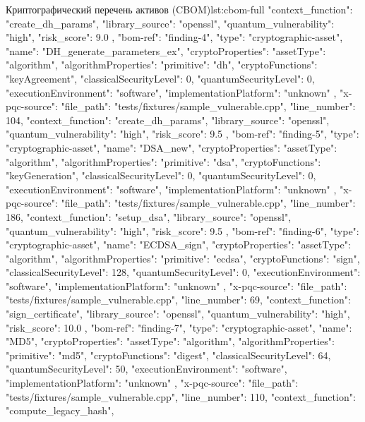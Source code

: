 \documentclass{itmo-vkr}
\begin{document}
\begin{itmolisting}[JSON]{Криптографический перечень активов (CBOM)}{lst:cbom-full}
{{{				"context_function": "create_dh_params",
				"library_source": "openssl",
				"quantum_vulnerability": "high",
				"risk_score": 9.0
			}
		},
		{
			"bom-ref": "finding-4",
			"type": "cryptographic-asset",
			"name": "DH_generate_parameters_ex",
			"cryptoProperties": {
				"assetType": "algorithm",
				"algorithmProperties": {
					"primitive": "dh",
					"cryptoFunctions": "keyAgreement",
					"classicalSecurityLevel": 0,
					"quantumSecurityLevel": 0,
					"executionEnvironment": "software",
					"implementationPlatform": "unknown"
				}
			},
			"x-pqc-source": {
				"file_path": "tests/fixtures/sample_vulnerable.cpp",
				"line_number": 104,
				"context_function": "create_dh_params",
				"library_source": "openssl",
				"quantum_vulnerability": "high",
				"risk_score": 9.5
			}
		},
		{
			"bom-ref": "finding-5",
			"type": "cryptographic-asset",
			"name": "DSA_new",
			"cryptoProperties": {
				"assetType": "algorithm",
				"algorithmProperties": {
					"primitive": "dsa",
					"cryptoFunctions": "keyGeneration",
					"classicalSecurityLevel": 0,
					"quantumSecurityLevel": 0,
					"executionEnvironment": "software",
					"implementationPlatform": "unknown"
				}
			},
			"x-pqc-source": {
				"file_path": "tests/fixtures/sample_vulnerable.cpp",
				"line_number": 186,
				"context_function": "setup_dsa",
				"library_source": "openssl",
				"quantum_vulnerability": "high",
				"risk_score": 9.5
			}
		},
		{
			"bom-ref": "finding-6",
			"type": "cryptographic-asset",
			"name": "ECDSA_sign",
			"cryptoProperties": {
				"assetType": "algorithm",
				"algorithmProperties": {
					"primitive": "ecdsa",
					"cryptoFunctions": "sign",
					"classicalSecurityLevel": 128,
					"quantumSecurityLevel": 0,
					"executionEnvironment": "software",
					"implementationPlatform": "unknown"
				}
			},
			"x-pqc-source": {
				"file_path": "tests/fixtures/sample_vulnerable.cpp",
				"line_number": 69,
				"context_function": "sign_certificate",
				"library_source": "openssl",
				"quantum_vulnerability": "high",
				"risk_score": 10.0
			}
		},
		{
			"bom-ref": "finding-7",
			"type": "cryptographic-asset",
			"name": "MD5",
			"cryptoProperties": {
				"assetType": "algorithm",
				"algorithmProperties": {
					"primitive": "md5",
					"cryptoFunctions": "digest",
					"classicalSecurityLevel": 64,
					"quantumSecurityLevel": 50,
					"executionEnvironment": "software",
					"implementationPlatform": "unknown"
				}
			},
			"x-pqc-source": {
				"file_path": "tests/fixtures/sample_vulnerable.cpp",
				"line_number": 110,
				"context_function": "compute_legacy_hash",
}}}
\end{itmolisting}
\end{document}
